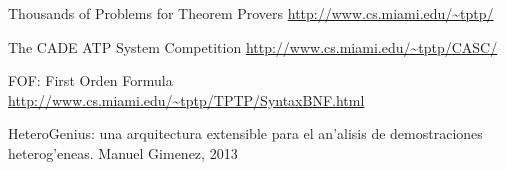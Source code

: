 
\begin{thebibliography}{tesis}

	Thousands of Problems for Theorem Provers
	\url{http://www.cs.miami.edu/~tptp/}

	The CADE ATP System Competition
	\url{http://www.cs.miami.edu/~tptp/CASC/}

	FOF: First Orden Formula
	\url{http://www.cs.miami.edu/~tptp/TPTP/SyntaxBNF.html}

	HeteroGenius: una arquitectura extensible para el an'alisis de demostraciones heterog'eneas.
	Manuel Gimenez, 2013

\end{thebibliography}

